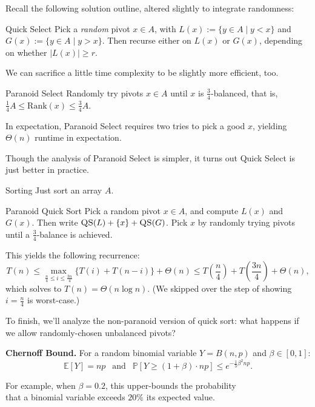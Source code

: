 Recall the following solution outline, altered slightly to integrate randomness:

\begin{solution}{Quick Select}
    Pick a \emph{random} pivot $x \in A$, with $L(x) := \{ y \in A \mid y < x\}$ and $G(x) := \{ y \in A \mid y > x \}$.  Then recurse either on $L(x)$ or $G(x)$, depending on whether $|L(x)| \geq r$.
\end{solution}

We can sacrifice a little time complexity to be slightly more efficient, too.

\begin{solution}{Paranoid Select}
    Randomly try pivots $x \in A$ until $x$ is $\frac{3}{4}$-balanced, that is, $\frac{1}{4}A \leq \mathrm{Rank}(x) \leq \frac{3}{4}A$.
\end{solution}

In expectation, Paranoid Select requires two tries to pick a good $x$, yielding $\Theta(n)$ runtime in expectation.

\begin{remark}
    Though the analysis of Paranoid Select is simpler, it turns out Quick Select is just better in practice.
\end{remark}

\begin{problem}{Sorting}
    Just sort an array $A$.
\end{problem}

\begin{solution}{Paranoid Quick Sort}
    Pick a random pivot $x \in A$, and compute $L(x)$ and $G(x)$.  Then write $\textsc{QS}(L) + \{x\} + \textsc{QS}(G)$.  Pick $x$ by randomly trying pivots until a $\frac{3}{4}$-balance is achieved.
\end{solution}

This yields the following recurrence:
\[ T(n) \leq \max_{\frac{n}{4} \leq i \leq \frac{3n}{4}} \{ T(i) + T(n - i) \} + \Theta(n) \leq T\left(\dfrac{n}{4}\right) + T\left(\dfrac{3n}{4}\right) + \Theta(n), \]
which solves to $T(n) = \Theta(n \log n)$.  (We skipped over the step of showing $i = \frac{n}{4}$ is worst-case.)

To finish, we'll analyze the non-paranoid version of quick sort: what happens if we allow randomly-chosen unbalanced pivots?

\begin{boxed-text}[34em]
    \textbf{Chernoff Bound.} For a random binomial variable $Y = B(n, p)$ and $\beta \in [0, 1]$: \vspace{-0.3cm}
    \[ \mathbb{E}[Y] = np ~~ \text{ and } ~~ \mathbb{P}[Y \geq (1 + \beta) \cdot np] \leq e^{-\frac{1}{3} \beta^2  np}. \] \vspace{-0.8cm}
    
    For example, when $\beta = 0.2$, this upper-bounds the probability \\ that a binomial variable exceeds $20\%$ its expected value.
\end{boxed-text}

